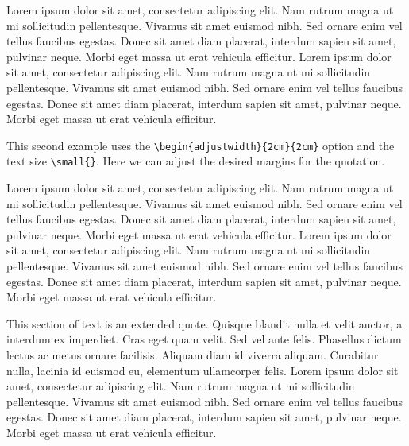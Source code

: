 Lorem ipsum dolor sit amet, consectetur adipiscing elit. Nam rutrum magna ut mi sollicitudin pellentesque. Vivamus sit amet euismod nibh. Sed ornare enim vel tellus faucibus egestas. Donec sit amet diam placerat, interdum sapien sit amet, pulvinar neque. Morbi eget massa ut erat vehicula efficitur. Lorem ipsum dolor sit amet, consectetur adipiscing elit. Nam rutrum magna ut mi sollicitudin pellentesque. Vivamus sit amet euismod nibh. Sed ornare enim vel tellus faucibus egestas. Donec sit amet diam placerat, interdum sapien sit amet, pulvinar neque. Morbi eget massa ut erat vehicula efficitur. 


\newpage

This second example uses the \verb|\begin{adjustwidth}{2cm}{2cm}| option and the text size \verb|\small{}|. Here we can adjust the desired margins for the quotation. 

\vspace{0.4cm}

Lorem ipsum dolor sit amet, consectetur adipiscing elit. Nam rutrum magna ut mi sollicitudin pellentesque. Vivamus sit amet euismod nibh. Sed ornare enim vel tellus faucibus egestas. Donec sit amet diam placerat, interdum sapien sit amet, pulvinar neque. Morbi eget massa ut erat vehicula efficitur. Lorem ipsum dolor sit amet, consectetur adipiscing elit. Nam rutrum magna ut mi sollicitudin pellentesque. Vivamus sit amet euismod nibh. Sed ornare enim vel tellus faucibus egestas. Donec sit amet diam placerat, interdum sapien sit amet, pulvinar neque. Morbi eget massa ut erat vehicula efficitur. 


\vspace{0.4cm}

\begin{adjustwidth}{2cm}{2cm}

\small{This section of text is an extended quote. Quisque blandit nulla et velit auctor, a interdum ex imperdiet. Cras eget quam velit. Sed vel ante felis. Phasellus dictum lectus ac metus ornare facilisis. Aliquam diam id viverra aliquam. Curabitur nulla, lacinia id euismod eu, elementum ullamcorper felis. Lorem ipsum dolor sit amet, consectetur adipiscing elit. Nam rutrum magna ut mi sollicitudin pellentesque. Vivamus sit amet euismod nibh. Sed ornare enim vel tellus faucibus egestas. Donec sit amet diam placerat, interdum sapien sit amet, pulvinar neque. Morbi eget massa ut erat vehicula efficitur. 
} \parencite[][p. 100]{sennett1998corrosion}

\end{adjustwidth}

